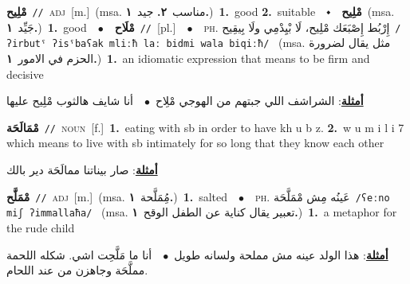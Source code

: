 \documentclass[10pt,a4paper,twoside]{article} %
\begin{document}
\begin{multicols}{2}
{\setlength\topsep{0pt}\textbf{\foreignlanguage{arabic}{مْلِيح}}\ {\color{gray}\texttt{//}\color{black}}\ \textsc{adj}\ [m.]\ \color{gray}(msa. \foreignlanguage{arabic}{مناسب}~\foreignlanguage{arabic}{\textbf{٢.}}  \foreignlanguage{arabic}{جيد}~\foreignlanguage{arabic}{\textbf{١.}})\color{black}\ \textbf{1.}~good  \textbf{2.}~suitable\ \ $\smblkdiamond$\ \ \setlength\topsep{0pt}\textbf{\foreignlanguage{arabic}{مْلِيح}}\ \color{gray}(msa. \foreignlanguage{arabic}{جَيِّد}~\foreignlanguage{arabic}{\textbf{١.}})\color{black}\ \textbf{1.}~good\ \ $\bullet$\ \ \setlength\topsep{0pt}\textbf{\foreignlanguage{arabic}{مْلَاح}}\ {\color{gray}\texttt{//}\color{black}}\ [pl.]\ \ $\bullet$\ \ \textsc{ph.} \color{gray} \foreignlanguage{arabic}{إِرْبُط إِصْبَعَك مْلِيح، لَا بْيِدْمِي ولَا بِيقِيح}\color{black}\ {\color{gray}\texttt{/{\sffamily ʔirbutˤ ʔisˤbaʕak mliːħ laː bidmi wala biqiːħ}/}\color{black}}\ \color{gray} (msa. \foreignlanguage{arabic}{مثل يقال لضرورة الحزم في الامور}~\foreignlanguage{arabic}{\textbf{١.}})\color{black}\ \textbf{1.}~an idiomatic expression that means to be firm and decisive\  \begin{flushright}\color{gray}\foreignlanguage{arabic}{\textbf{\underline{\foreignlanguage{arabic}{أمثلة}}}: الشراشف اللي جبتهم من الهوجي مْلِاح\ $\bullet$\ \  أنا شايف هالثوب مْلِيح عليها}\end{flushright}\color{black}} \vspace{2mm}

{\setlength\topsep{0pt}\textbf{\foreignlanguage{arabic}{مْمَالَحَة}}\ {\color{gray}\texttt{//}\color{black}}\ \textsc{noun}\ [f.]\ \textbf{1.}~eating with sb in order to have kh u b z.  \textbf{2.}~w u m i l i 7 which means to live with sb intimately for so long that they know each other\  \begin{flushright}\color{gray}\foreignlanguage{arabic}{\textbf{\underline{\foreignlanguage{arabic}{أمثلة}}}: صار بيناتنا ممالَحَة دير بالك}\end{flushright}\color{black}} \vspace{2mm}

{\setlength\topsep{0pt}\textbf{\foreignlanguage{arabic}{مْمَلَّح}}\ {\color{gray}\texttt{//}\color{black}}\ \textsc{adj}\ [m.]\ \color{gray}(msa. \foreignlanguage{arabic}{مُِمَلَّحة}~\foreignlanguage{arabic}{\textbf{١.}})\color{black}\ \textbf{1.}~salted\ \ $\bullet$\ \ \textsc{ph.} \color{gray} \foreignlanguage{arabic}{عَينُه مِش مْمَلَّحَة}\color{black}\ {\color{gray}\texttt{/{\sffamily ʕeːno miʃ ʔimmallaħa}/}\color{black}}\ \color{gray} (msa. \foreignlanguage{arabic}{تعبير يقال كناية عن الطفل الوقح}~\foreignlanguage{arabic}{\textbf{١.}})\color{black}\ \textbf{1.}~a metaphor for the rude child\  \begin{flushright}\color{gray}\foreignlanguage{arabic}{\textbf{\underline{\foreignlanguage{arabic}{أمثلة}}}: هذا الولد عينه مش مملحة ولسانه طويل\ $\bullet$\ \  أنا ما مَلَّحِت اشي. شكله اللحمة مملَّحَة وجاهزن من عند اللحام.}\end{flushright}\color{black}} \vspace{2mm}


\end{multicols}
\end{document}
